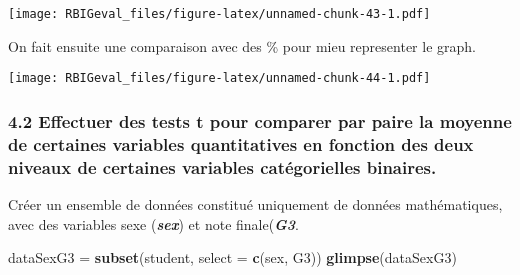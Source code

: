 \documentclass[
]{article}
\newenvironment{Shaded}{\begin{snugshade}}{\end{snugshade}}
\newcommand{\DataTypeTok}[1]{\textcolor[rgb]{0.13,0.29,0.53}{#1}}
\newcommand{\DecValTok}[1]{\textcolor[rgb]{0.00,0.00,0.81}{#1}}
\newcommand{\KeywordTok}[1]{\textcolor[rgb]{0.13,0.29,0.53}{\textbf{#1}}}
\newcommand{\NormalTok}[1]{#1}
\newcommand{\OperatorTok}[1]{\textcolor[rgb]{0.81,0.36,0.00}{\textbf{#1}}}
\newcommand{\StringTok}[1]{\textcolor[rgb]{0.31,0.60,0.02}{#1}}
\begin{document}
\texttt{[image: RBIGeval\_files/figure-latex/unnamed-chunk-43-1.pdf]}

On fait ensuite une comparaison avec des \% pour mieu representer le
graph.

\begin{Shaded}
\end{Shaded}

\texttt{[image: RBIGeval\_files/figure-latex/unnamed-chunk-44-1.pdf]}

\hypertarget{effectuer-des-tests-t-pour-comparer-par-paire-la-moyenne-de-certaines-variables-quantitatives-en-fonction-des-deux-niveaux-de-certaines-variables-catuxe9gorielles-binaires.}{%
\subsubsection{4.2 Effectuer des tests t pour comparer par paire la
moyenne de certaines variables quantitatives en fonction des deux
niveaux de certaines variables catégorielles
binaires.}\label{effectuer-des-tests-t-pour-comparer-par-paire-la-moyenne-de-certaines-variables-quantitatives-en-fonction-des-deux-niveaux-de-certaines-variables-catuxe9gorielles-binaires.}}

Créer un ensemble de données constitué uniquement de données
mathématiques, avec des variables sexe (\textbf{\emph{sex}}) et note
finale(\textbf{\emph{G3}}.

\begin{Shaded}
\begin{Highlighting}[]
\NormalTok{dataSexG3 =}\StringTok{ }\KeywordTok{subset}\NormalTok{(student, }\DataTypeTok{select =} \KeywordTok{c}\NormalTok{(sex, G3))}
\KeywordTok{glimpse}\NormalTok{(dataSexG3)}
\end{Highlighting}
\end{Shaded}
\end{document}
